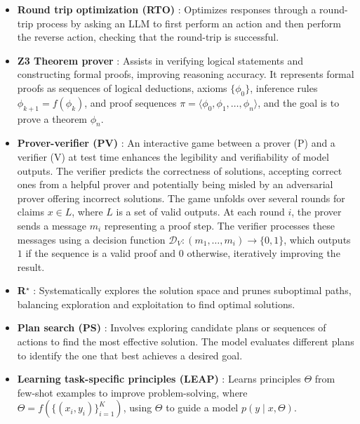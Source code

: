 \begin{itemize}
\item {\bf Round trip optimization (RTO)} \cite{allamanis2024unsupervised}: Optimizes responses through a round-trip process by asking an LLM to first perform an action and then perform the reverse action, checking that the round-trip is successful.

\item {\bf Z3 Theorem prover} \cite{de2008z3}: Assists in verifying logical statements and constructing formal proofs, improving reasoning accuracy. It represents formal proofs as sequences of logical deductions, axioms $\{\phi_0\}$, inference rules $\phi_{k+1} = f(\phi_k)$, and proof sequences $\pi = \langle \phi_0, \phi_1, \dots, \phi_n \rangle$, and the goal is to prove a theorem $\phi_n$.

\item {\bf Prover-verifier (PV)} \cite{kirchner2024prover}: An interactive game between a prover (P) and a verifier (V) at test time enhances the legibility and verifiability of model outputs. The verifier predicts the correctness of solutions, accepting correct ones from a helpful prover and potentially being misled by an adversarial prover offering incorrect solutions. The game unfolds over several rounds for claims $x \in L$, where $L$ is a set of valid outputs. At each round $i$, the prover sends a message $m_i$ representing a proof step. The verifier processes these messages using a decision function $ \mathcal{D}_V: (m_1, \dots, m_i) \rightarrow \{0,1\} $, which outputs $1$ if the sequence is a valid proof and $0$ otherwise, iteratively improving the result.

\item {\bf R$^\star$} \cite{likhachev2008r}: Systematically explores the solution space and prunes suboptimal paths, balancing exploration and exploitation to find optimal solutions.

\item {\bf Plan search (PS)} \cite{de2008z3}: Involves exploring candidate plans or sequences of actions to find the most effective solution. The model evaluates different plans to identify the one that best achieves a desired goal.

\item {\bf Learning task-specific principles (LEAP)} \cite{zhang2024context}: Learns principles $\Theta$ from few-shot examples to improve problem-solving, where $\Theta = f(\{(x_i, y_i)\}_{i=1}^K)$, using $\Theta$ to guide a model $p(y \mid x, \Theta)$. 
\end{itemize}



